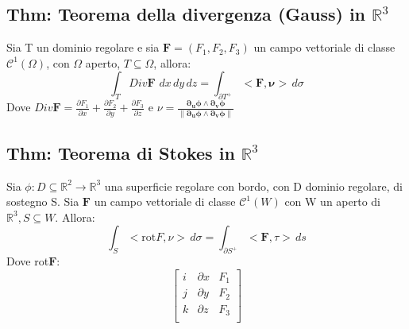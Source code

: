 \documentclass{article} %
\begin{document}
    \subsection*{Thm: Teorema della divergenza (Gauss) in $\mathbb{R}^3$}
    Sia T un dominio regolare e sia $\mathbf{F}=(F_1, F_2, F_3)$ un campo vettoriale di classe $\mathcal{C}^1(\Omega)$, con $\Omega$ aperto, $T \subseteq \Omega$, allora:
    $$\int_T Div \mathbf{F} \,\, dx \, dy \, dz = \int_{\partial T^+} <\mathbf{F}, \mathbf{\nu}> \, d\sigma$$
    Dove $ Div \mathbf{F} = \frac{\partial F_1}{\partial x} + \frac{\partial F_2}{\partial y} + \frac{\partial F_3}{\partial z}$ e $\nu = \frac{ \mathbf{ \partial_u \phi \wedge \partial_v \phi}}{\lVert \mathbf{ \partial_u \phi \wedge \partial_v \phi} \rVert}$

    \subsection*{Thm: Teorema di Stokes in $\mathbb{R}^3$}
    Sia $\phi:D \subseteq \mathbb{R}^2 \to \mathbb{R}^3$ una superficie regolare con bordo, con D dominio regolare, di sostegno S. Sia $\mathbf{F}$ un campo vettoriale di classe $\mathcal{C}^1(W)$ con W un aperto di $\mathbb{R}^3, S \subseteq W$. Allora:
    $$\int_S < \text{rot}F, \nu> \, d \sigma = \int_{\partial S^+} < \mathbf{F} , \tau > \, ds$$
    Dove rot$\mathbf{F}$:
    $$\begin{bmatrix}
        i & \partial x & F_1\\
        j & \partial y & F_2 \\
        k & \partial z & F_3 \\
    \end{bmatrix}$$
\end{document}
